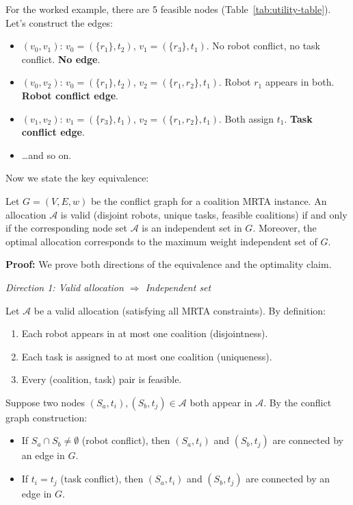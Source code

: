For the worked example, there are 5 feasible nodes (Table~\ref{tab:utility-table}). Let's construct the edges:
\begin{itemize}
\item $(v_0, v_1)$: $v_0 = (\{r_1\}, t_2)$, $v_1 = (\{r_3\}, t_1)$. No robot conflict, no task conflict. \textbf{No edge}.
\item $(v_0, v_2)$: $v_0 = (\{r_1\}, t_2)$, $v_2 = (\{r_1, r_2\}, t_1)$. Robot $r_1$ appears in both. \textbf{Robot conflict edge}.
\item $(v_1, v_2)$: $v_1 = (\{r_3\}, t_1)$, $v_2 = (\{r_1, r_2\}, t_1)$. Both assign $t_1$. \textbf{Task conflict edge}.
\item \ldots and so on.
\end{itemize}

Now we state the key equivalence:

\begin{lemma}
\label{lem:mrta-mwis}
Let $G = (V, E, w)$ be the conflict graph for a coalition MRTA instance. An allocation $\mathcal{A}$ is valid (disjoint robots, unique tasks, feasible coalitions) if and only if the corresponding node set $\mathcal{A}$ is an independent set in $G$.  Moreover, the optimal allocation corresponds to the maximum weight independent set of $G$.
\end{lemma}

\textbf{Proof:} We prove both directions of the equivalence and the optimality claim.

\textit{Direction 1: Valid allocation $\Rightarrow$ Independent set}

Let $\mathcal{A}$ be a valid allocation (satisfying all MRTA constraints). By definition:
\begin{enumerate}
\item Each robot appears in at most one coalition (disjointness).
\item Each task is assigned to at most one coalition (uniqueness).
\item Every (coalition, task) pair is feasible.
\end{enumerate}

Suppose two nodes $(S_a, t_i), (S_b, t_j) \in \mathcal{A}$ both appear in $\mathcal{A}$. By the conflict graph construction:

\begin{itemize}
\item If $S_a \cap S_b \neq \emptyset$ (robot conflict), then $(S_a, t_i)$ and $(S_b, t_j)$ are connected by an edge in $G$.
\item If $t_i = t_j$ (task conflict), then $(S_a, t_i)$ and $(S_b, t_j)$ are connected by an edge in $G$.
\end{itemize}


